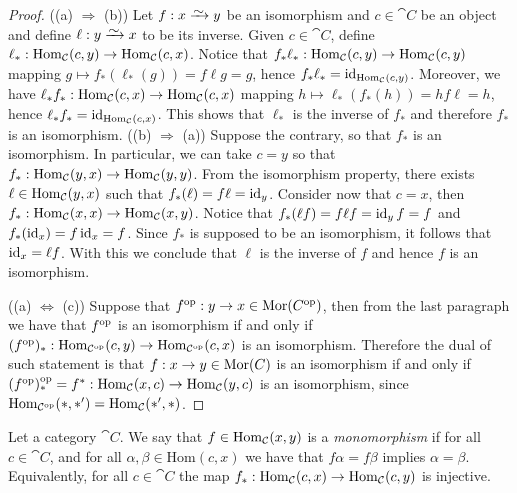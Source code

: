 \begin{proof}
  ((a) \(\Rightarrow\) (b)) Let \(f: x \isoto y\) be an isomorphism and \(c
  \in \cat C\) be an object and define \(\ell : y \isoto x\) to be its inverse.
  Given \(c \in \cat C\), define \(\ell_*: \operatorname{Hom}_{\mathcal C}(c, y) \to \operatorname{Hom}_{\mathcal
  C}(c, x)\). Notice that \(f_* \ell_* : \operatorname{Hom}_{\mathcal C}(c, y) \to
  \operatorname{Hom}_{\mathcal C}(c, y)\) mapping \(g \mapsto f_*(\ell_*(g)) = f \ell
  g = g\), hence \(f_* \ell_* = \operatorname{id}_{\operatorname{Hom}_{\mathcal C}(c, y)}\). Moreover, we
  have \(\ell_* f_* : \operatorname{Hom}_{\mathcal C}(c, x) \to \operatorname{Hom}_{\mathcal C}(c, x)\) mapping \(h \mapsto
\ell_*(f_*(h)) = h f \ell = h\), hence
  \(\ell_* f_* = \operatorname{id}_{\operatorname{Hom}_{\mathcal C}(c, x)}\). This shows that \(\ell_*\)
  is the inverse of \(f_*\) and therefore \(f_*\) is an isomorphism. ((b)
  \(\Rightarrow\) (a)) Suppose the contrary, so that \(f_*\) is an isomorphism.
  In particular, we can take \(c = y\) so that \(f_*: \operatorname{Hom}_{\mathcal C}(y, x) \to
  \operatorname{Hom}_{\mathcal C}(y, y)\). From the isomorphism property, there exists \(\ell \in
  \operatorname{Hom}_{\mathcal C}(y, x)\) such that \(f_*(\ell) = f \ell = \operatorname{id}_y\). Consider
  now that \(c = x\), then \(f_*: \operatorname{Hom}_{\mathcal C}(x, x) \to \operatorname{Hom}_{\mathcal C}(x, y)\).
  Notice that \(f_*(\ell f) = f \ell f = \operatorname{id}_y f = f\)
  and \(f_*(\operatorname{id}_x) = f \operatorname{id}_x = f\). Since \(f_*\) is supposed to be an
  isomorphism, it follows that \(\operatorname{id}_x = \ell f\). With this we conclude
  that \(\ell\) is the inverse of \(f\) and hence \(f\) is an isomorphism.

  ((a) \(\Leftrightarrow\) (c)) Suppose that \(f^{\mathrm{op}}: y \to x \in \mathcal
  {\operatorname{Mor}}(C^{\mathrm{op}})\), then from the last paragraph we have that \(f^{\mathrm{op}}\) is an
  isomorphism if and only if \((f^{\mathrm{op}})_* : \operatorname{Hom}_{\mathcal C^{\mathrm{op}}}(c, y) \to
  \operatorname{Hom}_{\mathcal C^{\mathrm{op}}}(c, x)\) is an isomorphism. Therefore the dual of such
  statement is that \(f: x \to y \in \mathcal {\operatorname{Mor}}(C)\) is an isomorphism if and
  only if \((f^{\mathrm{op}})_*^{\mathrm{op}} = f^*: \operatorname{Hom}_{\mathcal C}(x, c) \to \operatorname{Hom}_{\mathcal C}(y, c)\)
  is an isomorphism, since \(\operatorname{Hom}_{\mathcal C^{\mathrm{op}}}(*, *') = \operatorname{Hom}_{\mathcal C}(*', *)\).
\end{proof}

\begin{definition}[Monomorphism]\label{def: monomorphism}
  Let a category \(\cat{C}\). We say that \(f \in \operatorname{Hom}_{\mathcal C}(x, y)\) is a
  \emph{monomorphism} if for all \(c \in \cat{C}\), and for all \(\alpha, \beta
  \in \mathrm{Hom}(c, x)\) we have that \(f \alpha = f \beta\) implies \(\alpha
  = \beta\). Equivalently, for all \(c \in \cat C\) the map \(f_*: \operatorname{Hom}_{\mathcal
  C}(c, x) \to \operatorname{Hom}_{\mathcal C}(c, y)\) is injective.
\end{definition}

